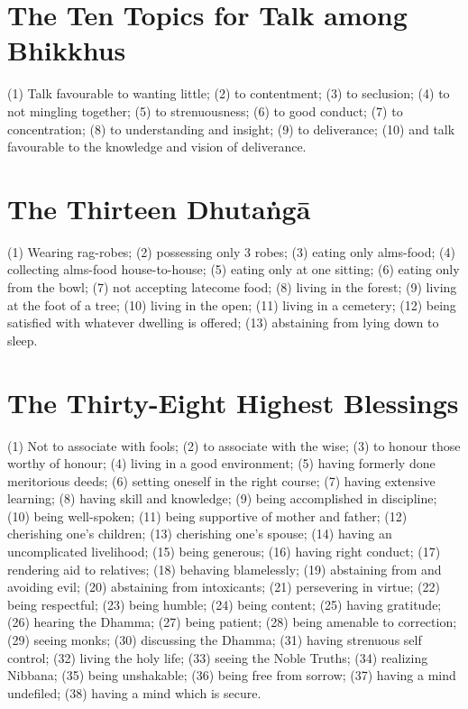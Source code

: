 
\section*{The Ten Topics for Talk among Bhikkhus}

(1) Talk favourable to wanting little;
(2) to contentment;
(3) to seclusion;
(4) to not mingling together;
(5) to strenuousness;
(6) to good conduct;
(7) to concentration;
(8) to understanding and insight;
(9) to deliverance;
(10) and talk favourable to the knowledge and vision of deliverance.


\section*{The Thirteen Dhutaṅgā}

(1) Wearing rag-robes;
(2) possessing only 3 robes;
(3) eating only alms-food;
(4) collecting alms-food house-to-house;
(5) eating only at one sitting;
(6) eating only from the bowl;
(7) not accepting latecome food;
(8) living in the forest;
(9) living at the foot of a tree;
(10) living in the open;
(11) living in a cemetery;
(12) being satisfied with whatever dwelling is offered;
(13) abstaining from lying down to sleep.


\section*{The Thirty-Eight Highest Blessings}


(1) Not to associate with fools;
(2) to associate with the wise;
(3) to honour those worthy of honour;
(4) living in a good environment;
(5) having formerly done meritorious deeds;
(6) setting oneself in the right course;
(7) having extensive learning;
(8) having skill and knowledge;
(9) being accomplished in discipline;
(10) being well-spoken;
(11) being supportive of mother and father;
(12) cherishing one's children;
(13) cherishing one's spouse;
(14) having an uncomplicated livelihood;
(15) being generous;
(16) having right conduct;
(17) rendering aid to relatives;
(18) behaving blamelessly;
(19) abstaining from and avoiding evil;
(20) abstaining from intoxicants;
(21) persevering in virtue;
(22) being respectful;
(23) being humble;
(24) being content;
(25) having gratitude;
(26) hearing the Dhamma;
(27) being patient;
(28) being amenable to correction;
(29) seeing monks;
(30) discussing the Dhamma;
(31) having strenuous self control;
(32) living the holy life;
(33) seeing the Noble Truths;
(34) realizing Nibbana;
(35) being unshakable;
(36) being free from sorrow;
(37) having a mind undefiled;
(38) having a mind which is secure.

